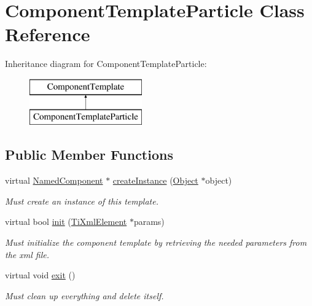 \hypertarget{classComponentTemplateParticle}{
\section{\-Component\-Template\-Particle \-Class \-Reference}
\label{d5/d74/classComponentTemplateParticle}
}
\-Inheritance diagram for \-Component\-Template\-Particle\-:\begin{figure}[H]
\begin{center}
\leavevmode
\includegraphics[height=2.000000cm]{d5/d74/classComponentTemplateParticle}
\end{center}
\end{figure}
\subsection*{\-Public \-Member \-Functions}
\begin{DoxyCompactItemize}
\item 
\hypertarget{classComponentTemplateParticle_ae2613fcf7db1cb94d8497de8e63130d4}{
virtual \hyperlink{classNamedComponent}{\-Named\-Component} $\ast$ \hyperlink{classComponentTemplateParticle_ae2613fcf7db1cb94d8497de8e63130d4}{create\-Instance} (\hyperlink{classObject}{\-Object} $\ast$object)}
\label{d5/d74/classComponentTemplateParticle_ae2613fcf7db1cb94d8497de8e63130d4}

\begin{DoxyCompactList}\small\item\em \-Must create an instance of this template. \end{DoxyCompactList}\item 
\hypertarget{classComponentTemplateParticle_ade4a5d2898e9a3c2ba9dabd3ada21728}{
virtual bool \hyperlink{classComponentTemplateParticle_ade4a5d2898e9a3c2ba9dabd3ada21728}{init} (\hyperlink{classTiXmlElement}{\-Ti\-Xml\-Element} $\ast$params)}
\label{d5/d74/classComponentTemplateParticle_ade4a5d2898e9a3c2ba9dabd3ada21728}

\begin{DoxyCompactList}\small\item\em \-Must initialize the component template by retrieving the needed parameters from the xml file. \end{DoxyCompactList}\item 
\hypertarget{classComponentTemplateParticle_a933add1e0607bf59a2eb966b840d52ba}{
virtual void \hyperlink{classComponentTemplateParticle_a933add1e0607bf59a2eb966b840d52ba}{exit} ()}
\label{d5/d74/classComponentTemplateParticle_a933add1e0607bf59a2eb966b840d52ba}

\begin{DoxyCompactList}\small\item\em \-Must clean up everything and delete itself. \end{DoxyCompactList}\end{DoxyCompactItemize}
